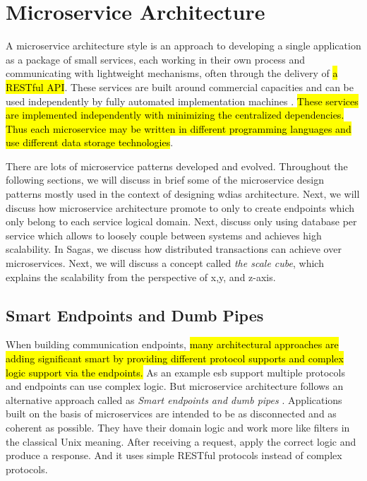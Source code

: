 \section{Microservice Architecture}
\label{se:microservice}

A microservice architecture style is an approach to developing a single application as a package of small services, each working in their own process and communicating with lightweight mechanisms, often through the delivery of \hl{a RESTful API}. These services are built around commercial capacities and can be used independently by fully automated implementation machines \cite{LewisMicroservices}. \hl{These services are implemented independently with minimizing the centralized dependencies. Thus each microservice may be written in different programming languages and use different data storage technologies}.


There are lots of microservice patterns developed and evolved. Throughout the following sections, we will discuss in brief some of the microservice design patterns mostly used in the context of designing \acrshort{wdias} architecture. Next, we will discuss how microservice architecture promote to only to create endpoints which only belong to each service logical domain. Next, discuss only using database per service which allows to loosely couple between systems and achieves high scalability. In Sagas, we discuss how distributed transactions can achieve over microservices. Next, we will discuss a concept called \emph{the scale cube}, which explains the scalability from the perspective of x,y, and z-axis.


\subsection{Smart Endpoints and Dumb Pipes}
\label{subse:dumb_pipes}

When building communication endpoints, \hl{many architectural approaches are adding significant smart by providing different protocol supports and complex logic support via the endpoints.} As an example \acrshort{esb} support multiple protocols and endpoints can use complex logic. But microservice architecture follows an alternative approach called as \emph{Smart endpoints and dumb pipes} \cite{LewisMicroservicesPipes}.
Applications built on the basis of microservices are intended to be as disconnected and as coherent as possible. They have their domain logic and work more like filters in the classical Unix meaning. After receiving a request, apply the correct logic and produce a response. And it uses simple RESTful protocols instead of complex protocols.

